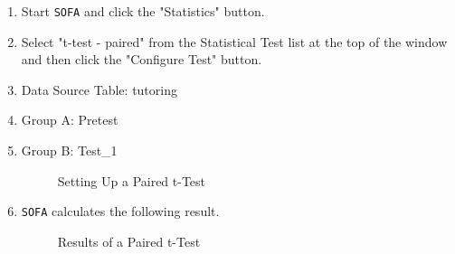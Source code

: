 \begin{enumerate}
  \item Start \texttt{SOFA} and click the "Statistics" button.
  \item Select "t-test - paired" from the Statistical Test list at the top of the window and then click the "Configure Test" button.
  \item Data Source Table: tutoring
  \item Group A: Pretest
  \item Group B: Test\_1
  
  \begin{figure}[H]
    \begin{center}
      \caption{Setting Up a Paired t-Test}
    \end{center}
  \end{figure}
  
  \item \texttt{SOFA} calculates the following result.
  
  \begin{figure}[H]
    \begin{center}
      \caption{Results of a Paired t-Test}
    \end{center}
  \end{figure}
  

\end{enumerate}
